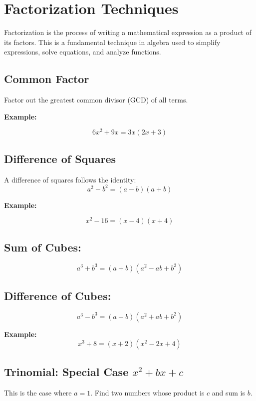 \newpage
\section{Factorization Techniques}

Factorization is the process of writing a mathematical expression as a product 
of its factors. This is a fundamental technique in algebra used to simplify expressions, 
solve equations, and analyze functions.

\subsection{Common Factor}

Factor out the greatest common divisor (GCD) of all terms.
\vspace{\baselineskip}

\textbf{Example:}

\[
6x^2 + 9x = 3x(2x + 3)
\]

\subsection{Difference of Squares}

A difference of squares follows the identity:
\[
a^2 - b^2 = (a - b)(a + b)
\]

\textbf{Example:}

\[
x^2 - 16 = (x - 4)(x + 4)
\]


\subsection{Sum of Cubes:}
\[
a^3 + b^3 = (a + b)(a^2 - ab + b^2)
\]

\subsection{Difference of Cubes:}
\[
a^3 - b^3 = (a - b)(a^2 + ab + b^2)
\]

\textbf{Example:}
\[
x^3 + 8 = (x + 2)(x^2 - 2x + 4)
\]


\subsection{Trinomial: Special Case \texorpdfstring{\(x^2 + bx + c\)}{x² + bx + c}}

This is the case where \(a = 1\). Find two numbers whose product is \(c\) and sum is \(b\).
\vspace{\baselineskip}

